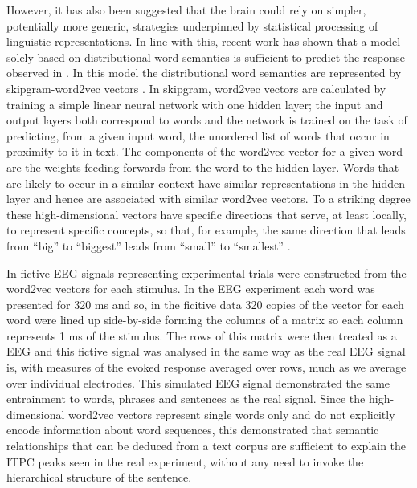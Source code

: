 \documentclass[10pt,letterpaper]{article}
\newcommand{\citet}[1]{\cite{#1}}
\begin{document}
However, it has also been suggested that the brain could rely on
simpler, potentially more generic, strategies underpinned by
statistical processing of linguistic representations. In line with
this, recent work \cite{FrankYang2018} has shown that a model solely
based on distributional word semantics is sufficient to predict the
response observed in \cite{DingEtAl2016, DingEtAl2017}. In this model
the distributional word semantics are represented by skipgram-word2vec
vectors \cite{MikolovEtAl2013,Bojanowski2017}. In skipgram, word2vec
vectors are calculated by training a simple linear neural network with
one hidden layer; the input and output layers both correspond to words
and the network is trained on the task of predicting, from a given
input word, the unordered list of words that occur in proximity to it
in text. The components of the word2vec vector for a given word are
the weights feeding forwards from the word to the hidden layer. Words
that are likely to occur in a similar context have similar
representations in the hidden layer and hence are associated with
similar word2vec vectors. To a striking degree these high-dimensional
vectors have specific directions that serve, at least locally, to
represent specific concepts, so that, for example, the same direction
that leads from ``big'' to ``biggest'' leads from ``small'' to
``smallest'' \cite{MikolovEtAl2013b, MikolovEtAl2013c}.

In \citet{FrankYang2018} fictive EEG signals representing experimental
trials were constructed from the word2vec vectors for each
stimulus. In the EEG experiment each word was presented for 320 ms and
so, in the ficitive data 320 copies of the vector for each word were
lined up side-by-side forming the columns of a matrix so each column
represents 1 ms of the stimulus. The rows of this matrix were then
treated as a EEG and this fictive signal was analysed in the same way
as the real EEG signal is, with measures of the evoked response
averaged over rows, much as we average over individual
electrodes. This simulated EEG signal demonstrated the same
entrainment to words, phrases and sentences as the real signal. Since
the high-dimensional word2vec vectors represent single words only and
do not explicitly encode information about word sequences, this
demonstrated that semantic relationships that can be deduced from a
text corpus are sufficient to explain the ITPC peaks seen in the real
experiment, without any need to invoke the hierarchical structure of
the sentence.
\end{document}
